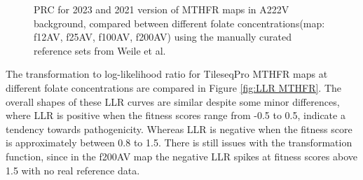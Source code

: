\documentclass{article}
\begin{document}
\begin{figure}[H]%
    \centering
    \qquad
    \caption{PRC for 2023 and 2021 version of MTHFR maps in A222V background, compared between different folate concentrations(map: f12AV, f25AV, f100AV, f200AV) using the manually curated reference sets from Weile et al.\cite{weile_shifting_2021}}%
    \label{fig:PRC MTHFR in A222V Background}%
\end{figure}

The transformation to log-likelihood ratio for TileseqPro MTHFR maps at different folate concentrations are compared in Figure \ref{fig:LLR MTHFR}. The overall shapes of these LLR curves are similar despite some minor differences, where LLR is positive when the fitness scores range from -0.5 to 0.5, indicate a tendency towards pathogenicity. Whereas LLR is negative when the fitness score is approximately between 0.8 to 1.5. There is still issues with the transformation function, since in the f200AV map the negative LLR spikes at fitness scores above 1.5 with no real reference data. 
\end{document}

